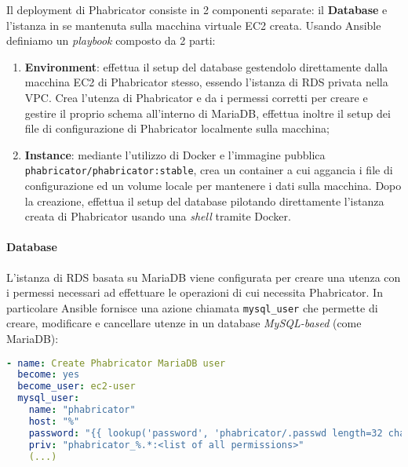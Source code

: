 \documentclass[../main.tex]{subfiles}
\begin{document}
    	    Il deployment di Phabricator consiste in 2 componenti separate: il \textbf{Database} e l'istanza in se mantenuta sulla macchina virtuale EC2 creata. Usando Ansible definiamo un \emph{playbook} composto da 2 parti:
    	    \begin{enumerate}
    	        \item \textbf{Environment}: effettua il setup del database gestendolo direttamente dalla macchina EC2 di Phabricator stesso, essendo l'istanza di RDS privata nella VPC. Crea l'utenza di Phabricator e da i permessi corretti per creare e gestire il proprio schema all'interno di MariaDB, effettua inoltre il setup dei file di configurazione di Phabricator localmente sulla macchina;
    	        \item \textbf{Instance}: mediante l'utilizzo di Docker e l'immagine pubblica \\\verb|phabricator/phabricator:stable|, crea un container a cui aggancia i file di configurazione ed un volume locale per mantenere i dati sulla macchina. Dopo la creazione, effettua il setup del database pilotando direttamente l'istanza creata di Phabricator usando una \emph{shell} tramite Docker.
    	    \end{enumerate}
    	
    	    \paragraph{Database}
    	    L'istanza di RDS basata su MariaDB viene configurata per creare una utenza con i permessi necessari ad effettuare le operazioni di cui necessita Phabricator. In particolare Ansible fornisce una azione chiamata \verb|mysql_user| che permette di creare, modificare e cancellare utenze in un database \emph{MySQL-based} (come MariaDB):
    	    \begin{lstlisting}[language=yaml]
- name: Create Phabricator MariaDB user
  become: yes
  become_user: ec2-user
  mysql_user:
    name: "phabricator"
    host: "%"
    password: "{{ lookup('password', 'phabricator/.passwd length=32 chars=ascii_letters,digits,hexdigits') }}"
    priv: "phabricator_%.*:<list of all permissions>"
    (...)
    	    \end{lstlisting}
    	    
\end{document}
